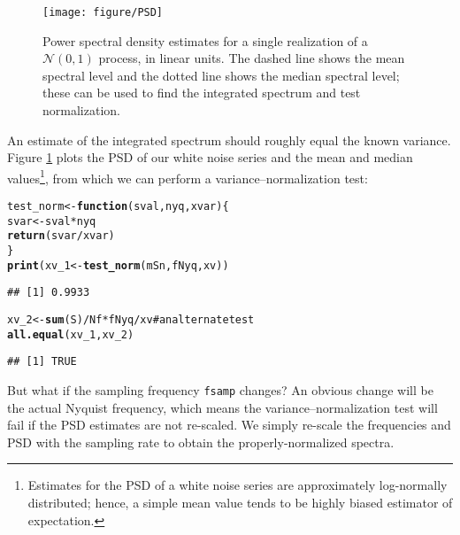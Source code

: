 \documentclass[12pt]{article}\usepackage{graphicx, color}
\makeatletter
\def\maxwidth{ %
  \ifdim\Gin@nat@width>\linewidth
    \linewidth
  \else
    \Gin@nat@width
  \fi
}
\newcommand{\hlfunctioncall}[1]{\textcolor[rgb]{0.501960784313725,0,0.329411764705882}{\textbf{#1}}}%
\newcommand{\hlcomment}[1]{\textcolor[rgb]{0.180392156862745,0.6,0.341176470588235}{#1}}%
\newenvironment{kframe}{%
 \def\at@end@of@kframe{}%
 \ifinner\ifhmode%
  \def\at@end@of@kframe{\end{minipage}}%
  \begin{minipage}{\columnwidth}%
 \fi\fi%
 \def\FrameCommand##1{\hskip\@totalleftmargin \hskip-\fboxsep
 \colorbox{shadecolor}{##1}\hskip-\fboxsep
     \hskip-\linewidth \hskip-\@totalleftmargin \hskip\columnwidth}%
 \MakeFramed {\advance\hsize-\width
   \@totalleftmargin\z@ \linewidth\hsize
   \@setminipage}}%
 {\par\unskip\endMakeFramed%
 \at@end@of@kframe}
\newenvironment{knitrout}{}{} %
\makeatother
\begin{document}
\begin{figure}[htb!]
\begin{center}
\begin{knitrout}
\color{fgcolor}
\texttt{[image: figure/PSD]} 

\end{knitrout}

\caption{Power spectral density estimates for a single realization of a 
$\mathcal{N}(0,1)$ process, in linear units.  
The dashed line shows the mean spectral level and the dotted line
shows the median spectral level; these can be
used to find the integrated spectrum and test normalization.}
\label{fig:psdN}
\end{center}
\end{figure}

An estimate of the integrated spectrum
should roughly equal the known variance.
Figure \ref{fig:psdN} plots the PSD of our white noise series and the 
mean and median values\footnote{
Estimates for the PSD of a white noise series
are approximately log-normally distributed; hence,
a simple mean value tends to be highly biased estimator of expectation.
}, from which we can perform a variance--normalization
test:
\begin{knitrout}
\color{fgcolor}\begin{kframe}
\begin{alltt}
test_norm <- \hlfunctioncall{function}(sval, nyq, xvar) \{
    svar <- sval * nyq
    \hlfunctioncall{return}(svar/xvar)
\}
\hlfunctioncall{print}(xv_1 <- \hlfunctioncall{test_norm}(mSn, fNyq, xv))
\end{alltt}
\begin{verbatim}
## [1] 0.9933
\end{verbatim}
\begin{alltt}
xv_2 <- \hlfunctioncall{sum}(S)/Nf * fNyq/xv  \hlcomment{# an alternate test}
\hlfunctioncall{all.equal}(xv_1, xv_2)
\end{alltt}
\begin{verbatim}
## [1] TRUE
\end{verbatim}
\end{kframe}
\end{knitrout}


But what if the sampling frequency \texttt{fsamp} changes? An obvious change will be
the actual Nyquist frequency, which means the variance--normalization test will
fail if the PSD estimates are not re-scaled.  We simply re-scale the frequencies
and PSD
with the sampling rate
to obtain the properly-normalized spectra.
\end{document}
